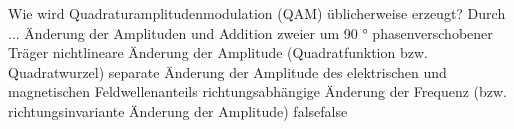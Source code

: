     {Wie wird Quadraturamplitudenmodulation (QAM) üblicherweise erzeugt? Durch ...}
    {Änderung der Amplituden und Addition zweier um 90 ° phasenverschobener Träger}
    {nichtlineare Änderung der Amplitude (Quadratfunktion bzw. Quadratwurzel)}
    {separate Änderung der Amplitude des elektrischen und magnetischen Feldwellenanteils}
    {richtungsabhängige Änderung der Frequenz (bzw. richtungsinvariante Änderung der Amplitude)}
    {false}{false}